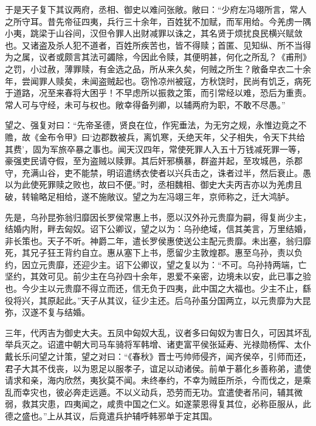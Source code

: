 \documentclass[12pt,UTF8]{ctexbook}
\begin{document}
于是天子复下其议两府，丞相、御史以难问张敞。敞曰：“少府左冯翊所言，常人之所守耳。昔先帝征四夷，兵行三十余年，百姓犹不加赋，而军用给。今羌虏一隅小夷，跳梁于山谷间，汉但令罪人出财减罪以诛之，其名贤于烦扰良民横兴赋敛也。又诸盗及杀人犯不道者，百姓所疾苦也，皆不得赎；首匿、见知纵、所不当得为之属，议者或颇言其法可蠲除，今因此令赎，其便明甚，何化之所乱？《甫刑》之罚，小过赦，薄罪赎，有金选之品，所从来久矣，何贼之所生？敞备皁衣二十余年，尝闻罪人赎矣，未闻盗贼起也。窃怜凉州被寇，方秋饶时，民尚有饥乏，病死于道路，况至来春将大困乎！不早虑所以振救之策，而引常经以难，恐后为重责。常人可与守经，未可与权也。敞幸得备列卿，以辅两府为职，不敢不尽愚。”



望之、强复对曰：“先帝圣德，贤良在位，作宪垂法，为无穷之规，永惟边竟之不赡，故《金布令甲》曰‘边郡数被兵，离饥寒，夭绝天年，父子相失，令天下共给其费’，固为军旅卒暴之事也。闻天汉四年，常使死罪人入五十万钱减死罪一等，豪强吏民请夺假，至为盗贼以赎罪。其后奸邪横暴，群盗并起，至攻城邑，杀郡守，充满山谷，吏不能禁，明诏遣绣衣使者以兴兵击之，诛者过半，然后衰止。愚以为此使死罪赎之败也，故曰不便。”时，丞相魏相、御史大夫丙吉亦以为羌虏且破，转输略足相给，遂不施敞议。望之为左冯翊三年，京师称之，迁大鸿胪。



先是，乌孙昆弥翁归靡因长罗侯常惠上书，愿以汉外孙元贵靡为嗣，得复尚少主，结婚内附，畔去匈奴。诏下公卿议，望之以为：乌孙绝域，信其美言，万里结婚，非长策也。天子不听。神爵二年，遣长罗侯惠使送公主配元贵靡。未出塞，翁归靡死，其兄子狂王背约自立。惠从塞下上书，愿留少主敦煌郡。惠至乌孙，责以负约，因立元贵靡，还迎少主。诏下公卿议，望之复以为：“不可。乌孙持两端，亡坚约，其效可见。前少主在乌孙四十余年，恩爱不亲密，边境未以安，此已事之验也。今少主以元贵靡不得立而还，信无负于四夷，此中国之大福也。少主不止，繇役将兴，其原起此。”天子从其议，征少主还。后乌孙虽分国两立，以元贵靡为大昆弥，汉遂不复与结婚。



三年，代丙吉为御史大夫。五凤中匈奴大乱，议者多曰匈奴为害日久，可因其坏乱举兵灭之。诏遣中朝大司马车骑将军韩增、诸吏富平侯张延寿、光禄勋杨恽、太仆戴长乐问望之计策，望之对曰：“《春秋》晋士丐帅师侵齐，闻齐侯卒，引师而还，君子大其不伐丧，以为恩足以服孝子，谊足以动诸侯。前单于慕化乡善称弟，遣使请求和亲，海内欣然，夷狄莫不闻。未终奉约，不幸为贼臣所杀，今而伐之，是乘乱而幸灾也，彼必奔走远遁。不以义动兵，恐劳而无功。宜遣使者吊问，辅其微弱，救其灾患，四夷闻之，咸贵中国之仁义。如遂蒙恩得复其位，必称臣服从，此德之盛也。”上从其议，后竟遣兵护辅呼韩邪单于定其国。
\end{document}

